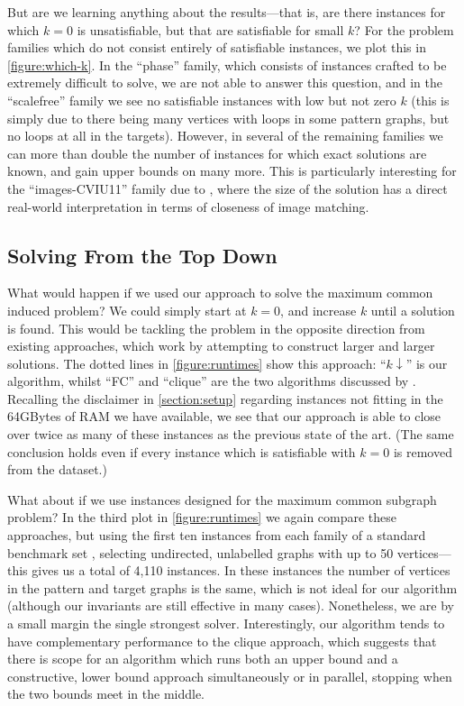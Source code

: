 \documentclass[letterpaper]{article}
\newcommand{\citet}[1]{\citeauthor{#1} \shortcite{#1}}
\newcommand{\citep}[1]{\cite{#1}}
\theoremstyle{definition}
\begin{document}
But are we learning anything about the results---that is, are there instances for which $k = 0$ is
unsatisfiable, but that are satisfiable for small $k$? For the problem families which do not consist
entirely of satisfiable instances, we plot this in \cref{figure:which-k}. In the ``phase'' family,
which consists of instances crafted to be extremely difficult to solve, we are not able to answer
this question, and in the ``scalefree'' family we see no satisfiable instances with low but not zero
$k$ (this is simply due to there being many vertices with loops in some pattern graphs, but no loops
at all in the targets). However, in several of the remaining families we can more than double the
number of instances for which exact solutions are known, and gain upper bounds on many more. This is
particularly interesting for the ``images-CVIU11'' family due to \citet{cviu11}, where the size of
the solution has a direct real-world interpretation in terms of closeness of image matching.

\subsection{Solving From the Top Down}\label{section:topdown}

What would happen if we used our approach to solve the maximum common induced problem? We could
simply start at $k = 0$, and increase $k$ until a solution is found. This would be tackling the
problem in the opposite direction from existing approaches, which work by attempting to construct
larger and larger solutions. The dotted lines in \cref{figure:runtimes} show this approach: ``$k
\downarrow$'' is our algorithm, whilst ``FC'' and ``clique'' are the two algorithms discussed by
\citet{DBLP:conf/cp/McCreeshNPS16}.  Recalling the disclaimer in \cref{section:setup}
regarding instances not fitting in the 64GBytes of RAM we have available, we see that our approach is
able to close over twice as many of these instances as the previous state of the art. (The same
conclusion holds even if every instance which is satisfiable with $k = 0$ is removed from the
dataset.)

What about if we use instances designed for the maximum common subgraph problem? In the third plot
in \cref{figure:runtimes} we again compare these approaches, but using the first ten instances from
each family of a standard benchmark set
\citep{DBLP:journals/prl/SantoFSV03,DBLP:journals/jgaa/ConteFV07}, selecting undirected, unlabelled
graphs with up to 50 vertices---this gives us a total of 4,110 instances. In these instances the
number of vertices in the pattern and target graphs is the same, which is not ideal for our
algorithm (although our invariants are still effective in many cases). Nonetheless, we are by a
small margin the single strongest solver. Interestingly, our algorithm tends to have complementary
performance to the clique approach, which suggests that there is scope for an algorithm which runs
both an upper bound and a constructive, lower bound approach simultaneously or in parallel, stopping
when the two bounds meet in the middle.
\end{document}

